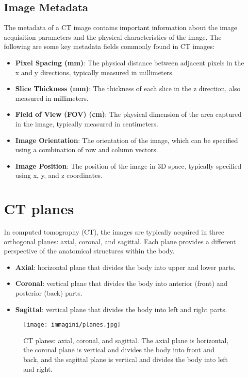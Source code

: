 \subsection{Image Metadata}
The metadata of a CT image contains important information about the image acquisition parameters and the physical characteristics of the image. The following are some key metadata fields commonly found in CT images:
\begin{itemize}
    \item \textbf{Pixel Spacing (mm)}: The physical distance between adjacent pixels in the x and y directions, typically measured in millimeters.
    \item \textbf{Slice Thickness (mm)}: The thickness of each slice in the z direction, also measured in millimeters.
    \item \textbf{Field of View (FOV) (cm)}: The physical dimension of the area captured in the image, typically measured in centimeters.
    \item \textbf{Image Orientation}: The orientation of the image, which can be specified using a combination of row and column vectors.
    \item \textbf{Image Position}: The position of the image in 3D space, typically specified using x, y, and z coordinates.
\end{itemize}

\section{CT planes}
In computed tomography (CT), the images are typically acquired in three orthogonal planes: axial, coronal, and sagittal. Each plane provides a different perspective of the anatomical structures within the body.
\begin{itemize}
    \item \textbf{Axial}: horizontal plane that divides the body into upper and lower parts.
    \item \textbf{Coronal}: vertical plane that divides the body into anterior (front) and posterior (back) parts.
    \item \textbf{Sagittal}: vertical plane that divides the body into left and right parts.
\end{itemize}

\begin{figure}
    \centering
    \texttt{[image: immagini/planes.jpg]}
    \caption{CT planes: axial, coronal, and sagittal. The axial plane is horizontal, the coronal plane is vertical and divides the body into front and back, and the sagittal plane is vertical and divides the body into left and right.}
    \label{fig:ct_planes}
\end{figure}




